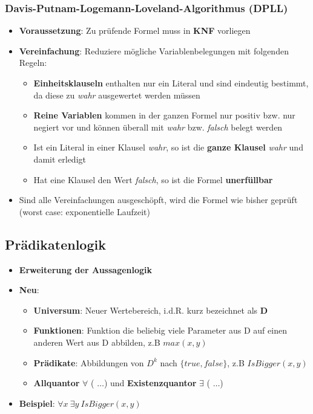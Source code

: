 \subsubsection{Davis-Putnam-Logemann-Loveland-Algorithmus (DPLL)}%
\label{wrep:ssub:davis_putnam_logemann_loveland_algorithmus}
\begin{itemize}
	\item \textbf{Voraussetzung}: Zu prüfende Formel muss in \textbf{KNF} vorliegen
	\item \textbf{Vereinfachung}: Reduziere mögliche Variablenbelegungen mit folgenden Regeln:
	\begin{itemize}
		\item \textbf{Einheitsklauseln} enthalten nur ein Literal und sind eindeutig bestimmt, da diese zu \textit{wahr} ausgewertet werden müssen
		\item \textbf{Reine Variablen} kommen in der ganzen Formel nur positiv bzw. nur negiert vor und können überall mit \textit{wahr} bzw. \textit{falsch} belegt werden
		\item Ist ein Literal in einer Klausel \textit{wahr}, so ist die \textbf{ganze Klausel} \textit{wahr} und damit erledigt
		\item Hat eine Klausel den Wert \textit{falsch}, so ist die Formel \textbf{unerfüllbar}
	\end{itemize}
	\item Sind alle Vereinfachungen ausgeschöpft, wird die Formel wie bisher geprüft (worst case: exponentielle Laufzeit)
\end{itemize}

\subsection{Prädikatenlogik}%
\label{wrep:sub:praedikatenlogik}

\begin{itemize}
	\item \textbf{Erweiterung der Aussagenlogik}
	\item \textbf{Neu}:
	\begin{itemize}
		\item \textbf{Universum}: Neuer Wertebereich, i.d.R. kurz bezeichnet als $\mathbf{D}$
		\item \textbf{Funktionen}: Funktion die beliebig viele Parameter aus D auf einen anderen Wert aus D abbilden, z.B $max(x, y)$
		\item \textbf{Prädikate}: Abbildungen von $D^k$ nach $\{true, false\}$, z.B $IsBigger(x, y)$
		\item \textbf{Allquantor} $\forall$ ( $\dots$) und \textbf{Existenzquantor} $\exists$ ( $\dots$)
	\end{itemize}
	\item \textbf{Beispiel}: $\forall x\ \exists y\ IsBigger(x, y)$
\end{itemize}